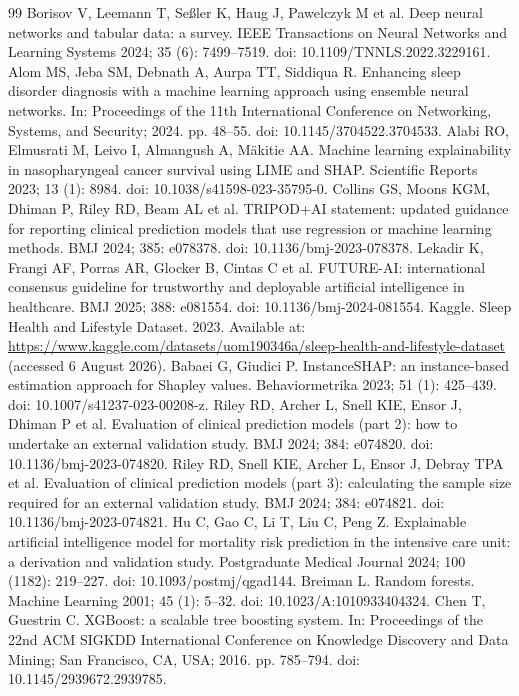 \documentclass[a4paper,fleqn]{cas-dc}
\begin{document}
\begin{thebibliography}{99}
 Borisov V, Leemann T, Se{\ss}ler K, Haug J, Pawelczyk M et al. Deep neural networks and tabular data: a survey. IEEE Transactions on Neural Networks and Learning Systems 2024; 35 (6): 7499--7519. doi: 10.1109/\allowbreak TNNLS.2022.3229161.
 Alom MS, Jeba SM, Debnath A, Aurpa TT, Siddiqua R. Enhancing sleep disorder diagnosis with a machine learning approach using ensemble neural networks. In: Proceedings of the 11th International Conference on Networking, Systems, and Security; 2024. pp. 48--55. doi: 10.1145/3704522.3704533.
 Alabi RO, Elmusrati M, Leivo I, Almangush A, M{\"a}kitie AA. Machine learning explainability in nasopharyngeal cancer survival using LIME and SHAP. Scientific Reports 2023; 13 (1): 8984. doi: 10.1038/s41598-023-35795-0.
 Collins GS, Moons KGM, Dhiman P, Riley RD, Beam AL et al. TRIPOD+AI statement: updated guidance for reporting clinical prediction models that use regression or machine learning methods. BMJ 2024; 385: e078378. doi: 10.1136/bmj-2023-078378.
 Lekadir K, Frangi AF, Porras AR, Glocker B, Cintas C et al. FUTURE-AI: international consensus guideline for trustworthy and deployable artificial intelligence in healthcare. BMJ 2025; 388: e081554. doi: 10.1136/bmj-2024-081554.
 Kaggle. Sleep Health and Lifestyle Dataset. 2023. Available at: \url{https://www.kaggle.com/datasets/uom190346a/sleep-health-and-lifestyle-dataset} (accessed 6 August 2026).
 Babaei G, Giudici P. InstanceSHAP: an instance-based estimation approach for Shapley values. Behaviormetrika 2023; 51 (1): 425--439. doi: 10.1007/s41237-023-00208-z.
 Riley RD, Archer L, Snell KIE, Ensor J, Dhiman P et al. Evaluation of clinical prediction models (part 2): how to undertake an external validation study. BMJ 2024; 384: e074820. doi: 10.1136/bmj-2023-074820.
 Riley RD, Snell KIE, Archer L, Ensor J, Debray TPA et al. Evaluation of clinical prediction models (part 3): calculating the sample size required for an external validation study. BMJ 2024; 384: e074821. doi: 10.1136/bmj-2023-074821.
 Hu C, Gao C, Li T, Liu C, Peng Z. Explainable artificial intelligence model for mortality risk prediction in the intensive care unit: a derivation and validation study. Postgraduate Medical Journal 2024; 100 (1182): 219--227. doi: 10.1093/postmj/qgad144.
 Breiman L. Random forests. Machine Learning 2001; 45 (1): 5--32. doi: 10.1023/A:1010933404324.
 Chen T, Guestrin C. XGBoost: a scalable tree boosting system. In: Proceedings of the 22nd ACM SIGKDD International Conference on Knowledge Discovery and Data Mining; San Francisco, CA, USA; 2016. pp. 785--794. doi: 10.1145/2939672.2939785.

\end{thebibliography}
\end{document}
